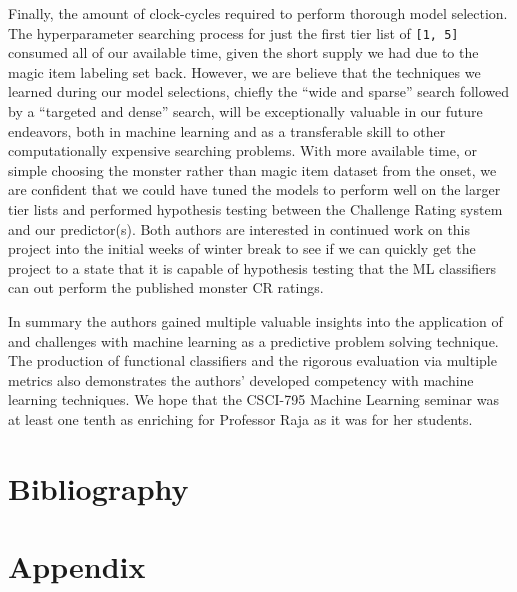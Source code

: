 \documentclass[12pt]{diazessay}
\begin{document}
Finally, the amount of clock-cycles required to perform thorough model selection.
The hyperparameter searching process for just the first tier list of \texttt{[1, 5]} consumed all of our available time, given the short supply we had due to the magic item labeling set back.
However, we are believe that the techniques we learned during our model selections, chiefly the ``wide and sparse'' search followed by a ``targeted and dense'' search, will be exceptionally valuable in our future endeavors, both in machine learning and as a transferable skill to other computationally expensive searching problems.
With more available time, or simple choosing the monster rather than magic item dataset from the onset, we are confident that we could have tuned the models to perform well on the larger tier lists and performed hypothesis testing between the Challenge Rating system and our predictor(s).
Both authors are interested in continued work on this project into the initial weeks of winter break to see if we can quickly get the project to a state that it is capable of hypothesis testing that the ML classifiers can out perform the published monster CR ratings.

In summary the authors gained multiple valuable insights into the application of and challenges with machine learning as a predictive problem solving technique.
The production of functional classifiers and the rigorous evaluation via multiple metrics also demonstrates the authors' developed competency with machine learning techniques.
We hope that the CSCI-795 Machine Learning seminar was at least one tenth as enriching for Professor Raja as it was for her students.


\clearpage

\section{Bibliography}




\clearpage

\section{Appendix}
\end{document}
